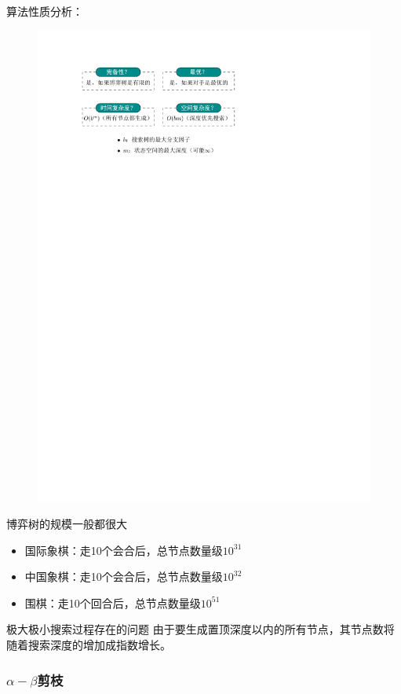 算法性质分析：
\begin{figure}[htbp]
    \centering
    \includegraphics{image/minmax性质.pdf}
\end{figure}
\begin{note}
    博弈树的规模一般都很大
    \begin{itemize}
        \item 国际象棋：走10个会合后，总节点数量级$10^{31}$
        \item 中国象棋：走10个会合后，总节点数量级$10^{32}$
        \item 围棋：走10个回合后，总节点数量级$10^{51}$
    \end{itemize}
\end{note}
极大极小搜索过程存在的问题
由于要\textcolor{main1}{生成置顶深度以内的所有节点}，其节点数将随着搜索深度的增加成指数增长。
\subsubsection{\texorpdfstring{$\alpha-\beta$}{α-β}剪枝}

